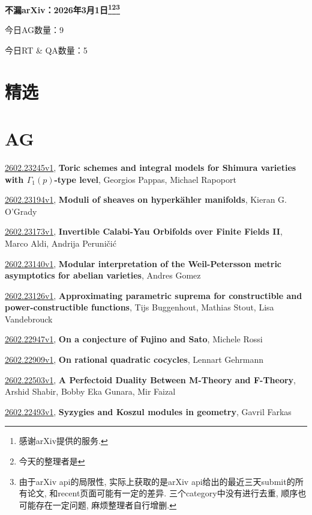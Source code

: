 \documentclass[9pt, a4paper]{article}
\theoremstyle{plain}
\theoremstyle{definition}
\theoremstyle{remark}
\newcommand{\arxiv}[3]{\href{https://arxiv.org/abs/#1}{#1}, \textbf{\textcolor{arxivblue}{#2}}, #3}
\newcommand{\AGnumber}{9}
\newcommand{\RTQAnumber}{5}
\newcommand{\NewestDate}{2026年3月1日}
\newcommand{\todayarXiver}{} %
\begin{document}
\begin{center}
    \Huge\textbf{不漏arXiv：\NewestDate\footnote{感谢arXiv提供的服务.}\footnote{今天的整理者是\todayarXiver}\footnote{由于arXiv api的局限性, 实际上获取的是arXiv api给出的最近三天submit的所有论文, 和recent页面可能有一定的差异. 三个category中没有进行去重, 顺序也可能存在一定问题, 麻烦整理者自行增删.}} \\
\end{center}

\setcounter{section}{-1}

\begin{center}
    今日AG数量：\AGnumber
    
    今日RT \& QA数量：\RTQAnumber
    
\end{center}


\section{精选}


\section{AG}
\arxiv{2602.23245v1}{Toric schemes and integral models for Shimura varieties with $Γ_1(p)$-type level}{Georgios Pappas, Michael Rapoport}

\arxiv{2602.23194v1}{Moduli of sheaves on hyperkähler manifolds}{Kieran G. O'Grady}

\arxiv{2602.23173v1}{Invertible Calabi-Yau Orbifolds over Finite Fields II}{Marco Aldi, Andrija Peruničić}

\arxiv{2602.23140v1}{Modular interpretation of the Weil-Petersson metric asymptotics for abelian varieties}{Andres Gomez}

\arxiv{2602.23126v1}{Approximating parametric suprema for constructible and power-constructible functions}{Tijs Buggenhout, Mathias Stout, Lisa Vandebrouck}

\arxiv{2602.22947v1}{On a conjecture of Fujino and Sato}{Michele Rossi}

\arxiv{2602.22909v1}{On rational quadratic cocycles}{Lennart Gehrmann}

\arxiv{2602.22503v1}{A Perfectoid Duality Between M-Theory and F-Theory}{Arshid Shabir, Bobby Eka Gunara, Mir Faizal}

\arxiv{2602.22493v1}{Syzygies and Koszul modules in geometry}{Gavril Farkas}

\end{document}

